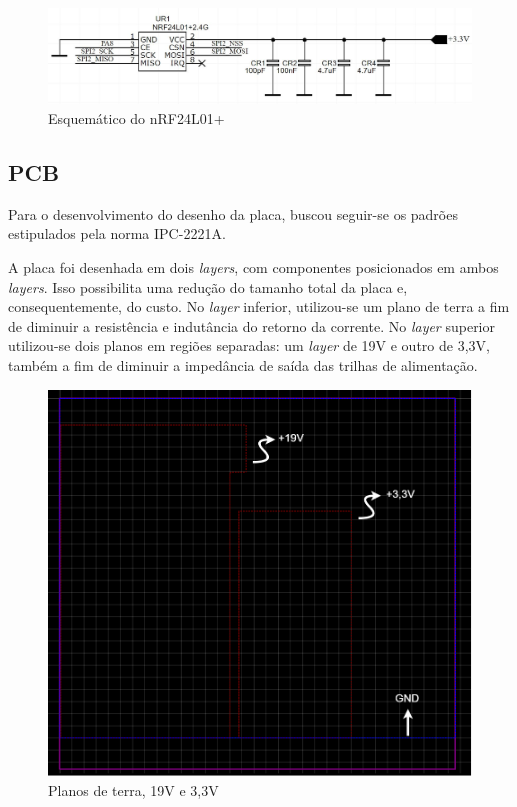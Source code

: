 \documentclass[
	12pt,				%
	openright,			%
	twoside,			%
	a4paper,			%
	english,			%
	french,				%
	spanish,			%
	brazil,				%
	]{abntex2}
\begin{document}
				\begin{figure}[!ht]
					\centering
					\includegraphics[width=\linewidth]{../Fotos/nrfEsquematico.jpg}
					\caption{Esquemático do nRF24L01+}
				\end{figure}
		\subsection{PCB}
			Para o desenvolvimento do desenho da placa, buscou seguir-se
			os padrões estipulados pela norma IPC-2221A.\cite{ipc}

			A placa foi desenhada em dois \textit{layers}, com componentes
			posicionados em ambos \textit{layers}. Isso possibilita uma redução
			do tamanho total da placa e, consequentemente, do custo. No
			\textit{layer} inferior, utilizou-se um plano de terra a fim de
			diminuir a resistência e indutância do retorno da corrente.
			No \textit{layer} superior utilizou-se dois planos em regiões
			separadas: um \textit{layer} de 19V e outro de 3,3V, também a fim de
			diminuir a impedância de saída das trilhas de alimentação.

			\begin{figure}[!ht]
				\centering
				\includegraphics[width=\linewidth]{../Fotos/pcbLayers.png}
				\caption{Planos de terra, 19V e 3,3V}
			\end{figure}
\end{document}
